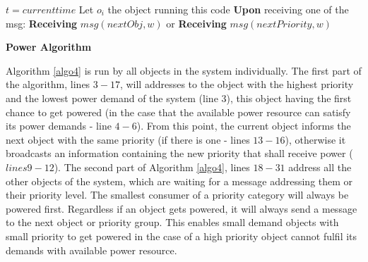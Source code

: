 \documentclass[../main/IoT.tex]{subfiles}
\begin{document}
\LinesNumbered
\IncMargin{1em}
\begin{algorithm}
$t = current time$
\BlankLine
Let $o_{i}$ the object running this code
\BlankLine
{}
\textbf{Upon} receiving one of the msg:\newline
\textbf{Receiving} $msg(nextObj, w)$ or\newline
\textbf{Receiving} $msg(nextPriority, w)$\newline
{}
\caption{\textbf{Power Algorithm}} \label{algo4}
\end{algorithm}
\DecMargin{1em}

Algorithm \ref{algo4} is run by all objects in the system individually. The first part of the algorithm, lines $3-17$, will addresses to the object with the highest priority and the lowest power demand of the system (line $3$), this object having the first chance to get powered (in the case that the available power resource can satisfy its power demands - line $4-6$). From this point, the current object informs the next object with the same priority (if there is one - lines $13-16$), otherwise it broadcasts an information containing the new priority that shall receive power ($lines 9-12$). The second part of Algorithm \ref{algo4}, lines $18-31$ address all the other objects of the system, which are waiting for a message addressing them or their priority level. The smallest consumer of a priority category will always be powered first. Regardless if an object gets powered, it will always send a message to the next object or priority group. This enables small demand objects with small priority to get powered in the case of a high priority object cannot fulfil its demands with available power resource.
\end{document}
